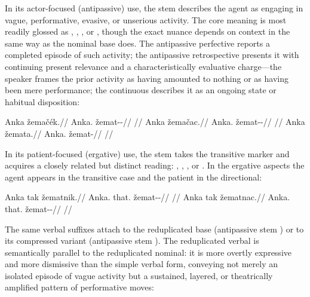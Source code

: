 In its actor-focused (antipassive) use, the stem describes the agent as engaging
in vague, performative, evasive, or unserious activity. The core meaning is most
readily glossed as , , , or , though the exact
nuance depends on context in the same way as the nominal base does. The
antipassive perfective  reports a completed episode of such
activity; the antipassive retrospective  presents it with
continuing present relevance and a characteristically evaluative charge---the
speaker frames the prior activity as having amounted to nothing or as having
been mere performance; the continuous  describes it as an ongoing
state or habitual disposition:

\pex
\a
\begingl
\gla Anka žemačék.//
\glb Anka.\Dir{} žemat-\Antip{}-\Pf{}//
\glft {}//
\endgl
\a
\begingl
\gla Anka žemačac.//
\glb Anka.\Dir{} žemat-\Antip{}-\Ret{}//
\glft {}//
\endgl
\a
\begingl
\gla Anka žemata.//
\glb Anka.\Dir{} žemat-\Cont{}//
\glft {}//
\endgl
\xe

In its patient-focused (ergative) use, the stem  takes the
transitive marker  and acquires a closely related but distinct reading:
, , , or . In the ergative
aspects the agent appears in the transitive case and the patient in the
directional:

\pex
\a
\begingl
\gla Anka tak žematnik.//
\glb Anka.\Trs{} that.\Dir{} žemat-\Trs{}-\Pf{}//
\glft {}//
\endgl
\a
\begingl
\gla Anka tak žematnac.//
\glb Anka.\Trs{} that.\Dir{} žemat-\Trs{}-\Ret{}//
\glft {}//
\endgl
\xe

The same verbal suffixes attach to the reduplicated base 
(antipassive stem ) or to its compressed variant 
(antipassive stem ). The reduplicated verbal is semantically
parallel to the reduplicated nominal: it is more overtly expressive and more
dismissive than the simple verbal form, conveying not merely an isolated episode
of vague activity but a sustained, layered, or theatrically amplified pattern of
performative moves:

